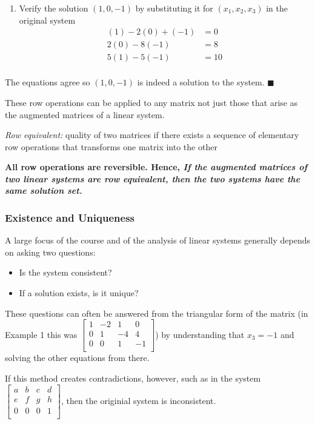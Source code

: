 \documentclass[12pt]{article} %
\begin{document}
\begin{enumerate}
	\item Verify the solution $(1, 0, -1)$ by substituting it for $(x_1, x_2, x_3)$ in the original system
		\begin{align*}
			(1) - 2(0) + (-1) &= 0\\
			2(0) - 8(-1) &= 8\\
			5(1) - 5(-1) &= 10\\
		\end{align*}
\end{enumerate}
The equations agree so $(1, 0, -1)$ is indeed a solution to the system. $\blacksquare$

These row operations can be applied to any matrix \textemdash not just those that arise as the augmented matrices of a linear system.

\emph{Row equivalent:} quality of two matrices if there exists a sequence of elementary row operations that transforms one matrix into the other

\textbf{All row operations are reversible. Hence, \emph{If the augmented matrices of two linear systems are row equivalent, then the two systems have the same solution set.}}

\subsubsection{Existence and Uniqueness}
A large focus of the course and of the analysis of linear systems generally depends on asking two questions:
\begin{itemize}
	\item Is the system consistent?
	\item If a solution exists, is it unique?
\end{itemize}
These questions can often be answered from the triangular form of the matrix (in Example 1 this was $\begin{bmatrix}1 & -2 & 1 & 0\\ 0 & 1 & -4 & 4\\0 & 0 & 1 & -1\\ \end{bmatrix}$) by understanding that $x_3 = -1$ and solving the other equations from there. 

If this method creates contradictions, however, such as in the system $\begin{bmatrix}a & b & c & d\\ e & f & g & h\\0 & 0 & 0 & 1\\ \end{bmatrix}$, then the originial system is inconsistent. 
\end{document}
